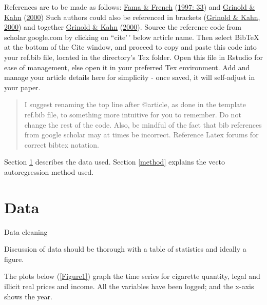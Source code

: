 \documentclass[11pt,preprint, authoryear]{elsarticle}
\numberwithin{equation}{section}
\numberwithin{figure}{section}
\numberwithin{table}{section}
\begin{document}
References are to be made as follows:
\protect\hyperlink{ref-fama1997}{Fama \& French}
(\protect\hyperlink{ref-fama1997}{1997: 33}) and
\protect\hyperlink{ref-grinold2000}{Grinold \& Kahn}
(\protect\hyperlink{ref-grinold2000}{2000}) Such authors could also be
referenced in brackets (\protect\hyperlink{ref-grinold2000}{Grinold \&
Kahn, 2000}) and together \protect\hyperlink{ref-grinold2000}{Grinold \&
Kahn} (\protect\hyperlink{ref-grinold2000}{2000}). Source the reference
code from scholar.google.com by clicking on ``cite'\,' below article
name. Then select BibTeX at the bottom of the Cite window, and proceed
to copy and paste this code into your ref.bib file, located in the
directory's Tex folder. Open this file in Rstudio for ease of
management, else open it in your preferred Tex environment. Add and
manage your article details here for simplicity - once saved, it will
self-adjust in your paper.

\begin{quote}
I suggest renaming the top line after @article, as done in the template
ref.bib file, to something more intuitive for you to remember. Do not
change the rest of the code. Also, be mindful of the fact that bib
references from google scholar may at times be incorrect. Reference
Latex forums for correct bibtex notation.
\end{quote}

Section \ref{data} describes the data used. Section \ref{method}
explains the vecto autoregression method used.

\hypertarget{data}{%
\section{\texorpdfstring{Data \label{data}}{Data }}\label{data}}

Data cleaning

Discussion of data should be thorough with a table of statistics and
ideally a figure.

The plots below (\ref{Figure1}) graph the time series for cigarette
quantity, legal and illicit real prices and income. All the variables
have been logged; and the x-axis shows the year.
\end{document}
